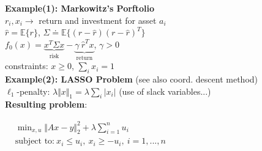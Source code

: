 \documentclass[a4paper]{article}
\begin{document}
\begin{multicols}{2}
    \noindent
    \textbf{Example(1): Markowitz's Porftolio}\\
    $r_i, x_i\to$ return and investment for asset $a_i$\\
    $\hat{r}=\mathbb{E}\{r\}$, $\Sigma\doteq\mathbb{E}\{(r-\hat{r})(r-\hat{r})^T\}$\\
    $f_0(x)=\underbrace{x^T\Sigma{x}}_{\text{risk}}-\underbrace{\gamma\ \hat{r}^T{x}}_{\text{return}}$, $\gamma>0$\\
    constraints: $x\ge0$, $\sum_{i}{x_i}=1$
    \newcolumn\\
    \textbf{Example(2): LASSO Problem} {\tiny{(see also coord. descent method)}}\\
    $\ell_1$-penalty: $\lambda{\Vert{x}\Vert_1}=\lambda\sum_{i} \vert x_i \vert$ (use of slack variables...) \\
    \textbf{Resulting problem}:
    \vspace{-0.3em}
    \begin{center}
        $\begin{aligned}
            &\min_{x,u} {\Vert Ax-y \Vert_2^2+\lambda\sum_{i=1}^n{u_i}}\\
            &\text{subject to:} \ x_i\le{u_i},  \ x_i\ge{-u_i}, \ i=1,..., n
        \end{aligned}$
    \end{center}
\end{multicols}
\end{document}
